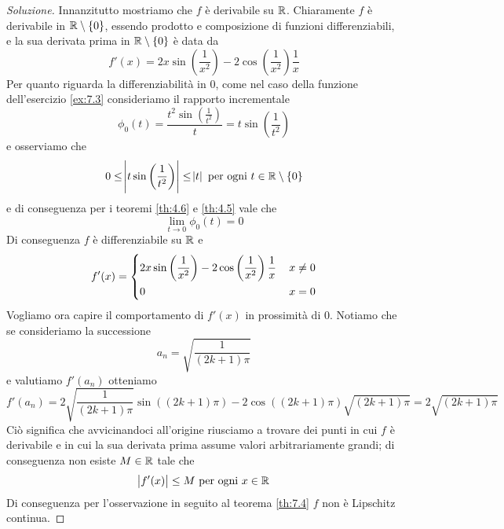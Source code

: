 \begin{proof}[Soluzione]
    Innanzitutto mostriamo che $f$ è derivabile su $\amsbb{R}$. Chiaramente $f$ è derivabile in $\amsbb{R}\setminus\{0\}$, essendo prodotto e composizione di funzioni differenziabili, e la sua derivata prima in $\amsbb{R}\setminus\{0\}$ è data da
    \[
    f'(x) = 2x\sin\left(\frac{1}{x^2}\right)-2\cos\left(\frac{1}{x^2}\right)\frac{1}{x}
    \]
    Per quanto riguarda la differenziabilità in $0$, come nel caso della funzione dell'esercizio \ref{ex:7.3} consideriamo il rapporto incrementale
    \[
    \phi_0(t) = \frac{t^2\sin\left(\frac{1}{t^2}\right)}{t} = t\sin\left(\frac{1}{t^2}\right)
    \]
    e osserviamo che
    \[
    0\le \abs{t\sin\left(\frac{1}{t^2}\right)}\le \abs{t}  \ \text{per ogni}\ t\in\amsbb{R}\setminus\{0\}
    \]
    e di conseguenza per i teoremi \ref{th:4.6} e \ref{th:4.5} vale che
    \[
    \lim_{t\to 0} \phi_0(t) = 0
    \]
    Di conseguenza $f$ è differenziabile su $\amsbb{R}$ e
    \[
    f'(x) = \begin{dcases}
        2x\sin\left(\frac{1}{x^2}\right)-2\cos\left(\frac{1}{x^2}\right)\frac{1}{x}\, & x\ne 0\\
        0\, & x=0
    \end{dcases}
    \]
    Vogliamo ora capire il comportamento di $f'(x)$ in prossimità di $0$. Notiamo che se consideriamo la successione
    \[
    a_n = \sqrt{\frac{1}{(2k+1)\pi}}
    \]
    e valutiamo $f'(a_n)$ otteniamo
    \[
    f'(a_n) = 2\sqrt{\frac{1}{(2k+1)\pi}}\sin((2k+1)\pi)-2\cos((2k+1)\pi)\sqrt{(2k+1)\pi} = 2\sqrt{(2k+1)\pi}
    \]
    Ciò significa che avvicinandoci all'origine riusciamo a trovare dei punti in cui $f$ è derivabile e in cui la sua derivata prima assume valori arbitrariamente grandi; di conseguenza non esiste $M\in\amsbb{R}$ tale che
    \[
    \abs{f'(x)}\le M \ \text{per ogni} \ x\in\amsbb{R}
    \]
    Di conseguenza per l'osservazione in seguito al teorema \ref{th:7.4} $f$ non è Lipschitz continua.
\end{proof}
\newpage
